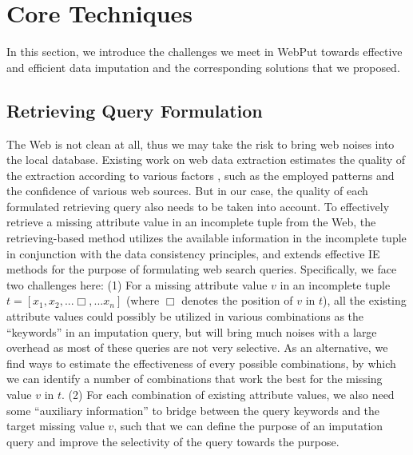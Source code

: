\documentclass[sigconf]{acmart}
\begin{document}
\section{Core Techniques}
\label{section:core}
In this section, we introduce the challenges we meet in WebPut towards effective and efficient data imputation and the corresponding solutions that we proposed.

\vspace{-10pt}
\subsection{Retrieving Query Formulation}

{\color{red} The Web is not clean at all, thus we may take the risk to bring web noises into the local database. Existing work on web data extraction estimates the quality of the extraction according to various factors , such as the employed patterns and the confidence of various web sources. But in our case, the quality of each formulated retrieving query also needs to be taken into account. }To effectively retrieve a missing attribute value in an incomplete tuple from the Web, the retrieving-based method utilizes the available information in the incomplete tuple in conjunction with the data consistency principles, and extends effective IE methods for the purpose of formulating web search queries. Specifically, we face two challenges here: (1) For a missing attribute value $v$ in an incomplete tuple $t=[x_1,x_2 , ... \Box, ... x_n]$ (where $\Box$ denotes the position of $v$ in $t$), all the existing attribute values could possibly be utilized in various combinations as the ``keywords'' in an imputation query, but will bring much noises with a large overhead as most of these queries are not very selective. As an alternative, we find ways to estimate the effectiveness of every possible combinations, by which we can identify a number of combinations that work the best for the missing value $v$ in $t$.
%
(2) For each combination of existing attribute values, we also need some ``auxiliary information'' to bridge between the query keywords and the target missing value $v$, such that we can define the purpose of an imputation query and improve the selectivity of the query towards the purpose.
\end{document}
